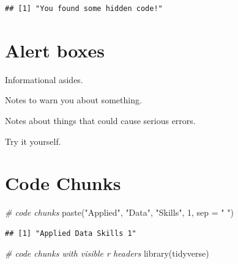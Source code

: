 \documentclass[
  oneside]{book}
\newenvironment{Shaded}{\begin{snugshade}}{\end{snugshade}}
\newcommand{\AttributeTok}[1]{\textcolor[rgb]{0.77,0.63,0.00}{#1}}
\newcommand{\CommentTok}[1]{\textcolor[rgb]{0.56,0.35,0.01}{\textit{#1}}}
\newcommand{\DecValTok}[1]{\textcolor[rgb]{0.00,0.00,0.81}{#1}}
\newcommand{\FunctionTok}[1]{\textcolor[rgb]{0.00,0.00,0.00}{#1}}
\newcommand{\NormalTok}[1]{#1}
\newcommand{\StringTok}[1]{\textcolor[rgb]{0.31,0.60,0.02}{#1}}
\begin{document}
\begin{verbatim}
## [1] "You found some hidden code!"
\end{verbatim}

\hypertarget{alert-boxes}{%
\section{Alert boxes}\label{alert-boxes}}

\begin{info}
Informational asides.

\end{info}

\begin{warning}
Notes to warn you about something.

\end{warning}

\begin{dangerous}
Notes about things that could cause serious errors.

\end{dangerous}

\begin{try}
Try it yourself.

\end{try}

\hypertarget{code-chunks}{%
\section{Code Chunks}\label{code-chunks}}

\begin{Shaded}
\begin{Highlighting}[]
\CommentTok{\# code chunks}
\FunctionTok{paste}\NormalTok{(}\StringTok{"Applied"}\NormalTok{, }\StringTok{"Data"}\NormalTok{, }\StringTok{"Skills"}\NormalTok{, }\DecValTok{1}\NormalTok{, }\AttributeTok{sep =} \StringTok{" "}\NormalTok{)}
\end{Highlighting}
\end{Shaded}

\begin{verbatim}
## [1] "Applied Data Skills 1"
\end{verbatim}

\begin{Shaded}
\begin{Highlighting}[]
\CommentTok{\# code chunks with visible r headers}
\FunctionTok{library}\NormalTok{(tidyverse)}
\end{Highlighting}
\end{Shaded}
\end{document}
